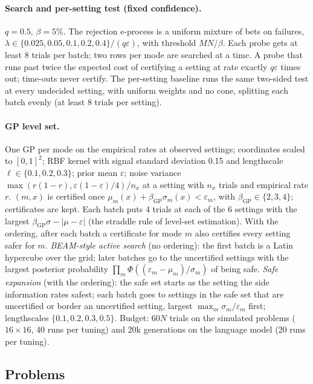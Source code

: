 \documentclass{article}
\newcommand{\eps}{\varepsilon}
\begin{document}
\paragraph{Search and per-setting test (fixed confidence).} $q=0.5$,
$\beta=5\%$. The rejection e-process is a uniform mixture of bets on
failures, $\lambda\in\{0.025,0.05,0.1,0.2,0.4\}/(q\eps)$, with threshold
$MN/\beta$. Each probe gets at least 8 trials per batch; two rows per mode
are searched at a time. A probe that runs past twice the expected cost of
certifying a setting at rate exactly $q\eps$ times out; time-outs never
certify. The per-setting baseline runs the same two-sided test at every
undecided setting, with uniform weights and no cone, splitting each batch
evenly (at least 8 trials per setting).

\paragraph{GP level set.} One GP per mode on the empirical rates at
observed settings; coordinates scaled to $[0,1]^2$; RBF kernel with signal
standard deviation 0.15 and lengthscale $\ell\in\{0.1,0.2,0.3\}$; prior
mean $\eps$; noise variance $\max(r(1-r),\eps(1-\eps)/4)/n_x$ at a setting
with $n_x$ trials and empirical rate $r$. $(m,x)$ is certified once
$\mu_m(x)+\beta_{\mathrm{GP}}\sigma_m(x)<\eps_m$, with
$\beta_{\mathrm{GP}}\in\{2,3,4\}$; certificates are kept. Each batch puts
4 trials at each of the 6 settings with the largest
$\beta_{\mathrm{GP}}\sigma-|\mu-\eps|$ (the straddle rule of level-set
estimation). With the ordering, after each batch a certificate for mode
$m$ also certifies every setting safer for $m$. \emph{BEAM-style active
search} (no ordering): the first batch is a Latin hypercube over the grid;
later batches go to the uncertified settings with the largest posterior
probability $\prod_m\Phi((\eps_m-\mu_m)/\sigma_m)$ of being safe.
\emph{Safe expansion} (with the ordering): the safe set starts as the
setting the side information rates safest; each batch goes to settings in
the safe set that are uncertified or border an uncertified setting, largest
$\max_m\sigma_m/\eps_m$ first; lengthscales $\{0.1,0.2,0.3,0.5\}$.
Budget: $60N$ trials on the simulated problems ($16\times16$, 40 runs
per tuning) and 20k generations on the language model (20 runs per
tuning).

\subsection{Problems}
\end{document}
